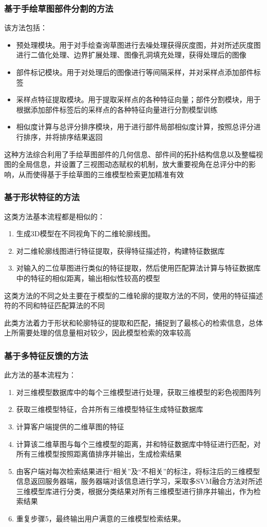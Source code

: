 \documentclass{article}
\begin{document}
\subsubsection{基于手绘草图部件分割的方法}
该方法包括：
\begin{itemize}
    \item 预处理模块。用于对手绘查询草图进行去噪处理获得灰度图，并对所述灰度图进行二值化处理、边界扩展处理、图像孔洞填充处理，获得处理后的图像
    \item 部件标记模块。用于对处理后的图像进行等间隔采样，并对采样点添加部件标签
    \item 采样点特征提取模块。用于提取采样点的各种特征向量；部件分割模块，用于根据添加部件标签后的采样点的各种特征向量进行分割模型训练
    \item 相似度计算与总评分排序模块，用于进行部件局部相似度计算，按照总评分进行排序，并将排序结果返回
\end{itemize}

这种方法综合利用了手绘草图部件的几何信息、部件间的拓扑结构信息以及整幅视图的全局信息，并设置了三视图动态赋权的机制，放大重要视角在总评分中的影响，从而使得基于手绘草图的三维模型检索更加精准有效
\subsubsection{基于形状特征的方法}
这类方法基本流程都是相似的：
\begin{enumerate}
    \item 生成3D模型在不同视角下的二维轮廓线图。
    \item 对二维轮廓线图进行特征提取，获得特征描述符，构建特征数据库
    \item 对输入的二位草图进行类似的特征提取，然后使用匹配算法计算与特征数据库中的特征的相似距离，输出相似性较高的模型
\end{enumerate}
   
这类方法的不同之处主要在于模型的二维轮廓的提取方法的不同，使用的特征描述符的不同和特征匹配算法的不同

此类方法着力于形状和轮廓特征的提取和匹配，捕捉到了最核心的检索信息，总体上所需要处理的信息量相对较少，因此模型检索的效率较高
\subsubsection{基于多特征反馈的方法}
此方法的基本流程为：
\begin{enumerate}
    \item 对三维模型数据库中的每个三维模型进行处理，获取三维模型的彩色视图阵列
    \item 获取三维模型特征，合并所有三维模型特征生成特征数据库
    \item 计算客户端提供的二维草图的特征
    \item 计算该二维草图与每个三维模型的距离，并和特征数据库中特征进行匹配，对所有三维模型按照距离值排序并输出，生成检索结果
    \item 由客户端对每次检索结果进行“相关”及“不相关”的标注，将标注后的三维模型信息返回服务器端，服务器端对该信息进行学习，采取多SVM融合方法对所述三维模型库进行分类，根据分类结果对所有三维模型进行排序并输出，作为检索结果
    \item 重复步骤5，最终输出用户满意的三维模型检索结果。
\end{enumerate}
\end{document}
